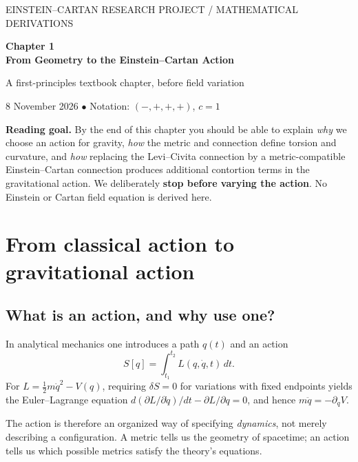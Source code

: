 \documentclass[11pt,a4paper]{article}
\begin{document}
\begin{center}
{\small EINSTEIN--CARTAN RESEARCH PROJECT \quad / \quad MATHEMATICAL DERIVATIONS}\par\vspace{5mm}
{\LARGE\bfseries\color{deep} Chapter 1\\ From Geometry to the Einstein--Cartan Action}\par\vspace{2mm}
{\large A first-principles textbook chapter, before field variation}\par\vspace{3mm}
{\small 8 November 2026 \quad $\bullet$ \quad Notation: $(-,+,+,+)$, $c=1$}\par
\end{center}
\vspace{2mm}
\begin{whybox}
\textbf{Reading goal.} By the end of this chapter you should be able to explain \emph{why} we choose an action for gravity, \emph{how} the metric and connection define torsion and curvature, and \emph{how} replacing the Levi--Civita connection by a metric-compatible Einstein--Cartan connection produces additional contortion terms in the gravitational action. We deliberately \textbf{stop before varying the action}. No Einstein or Cartan field equation is derived here.
\end{whybox}
\tableofcontents
\newpage
\section{From classical action to gravitational action}
\subsection{What is an action, and why use one?}
In analytical mechanics one introduces a path $q(t)$ and an action
\begin{equation}\label{eq:particle}
S[q]=\int_{t_1}^{t_2}L(q,\dot q,t)\,dt.
\end{equation}
For $L=\tfrac12m\dot q^2-V(q)$, requiring $\delta S=0$ for variations with fixed endpoints yields the Euler--Lagrange equation $d(\partial L/\partial\dot q)/dt-\partial L/\partial q=0$, and hence $m\ddot q=-\partial_qV$.

The action is therefore an organized way of specifying \emph{dynamics}, not merely describing a configuration. A metric tells us the geometry of spacetime; an action tells us which possible metrics satisfy the theory's equations.
\end{document}
